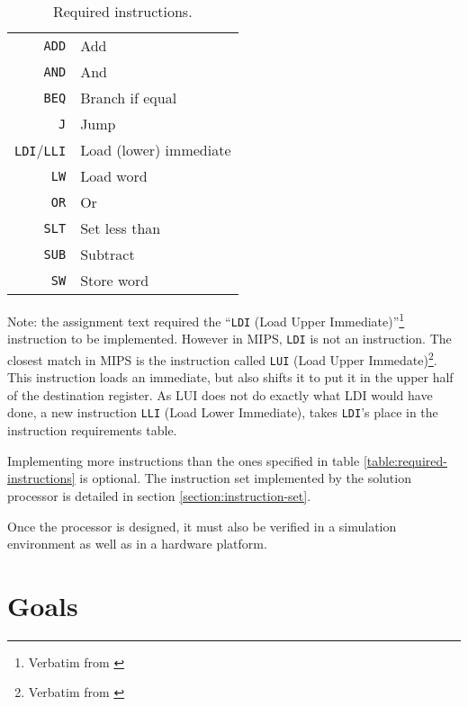 \begin{table}
    \begin{center}
        \begin{tabular}{r|l}
            \texttt{ADD} & Add \\
            \texttt{AND} & And \\
            \texttt{BEQ} & Branch if equal \\
            \texttt{J} & Jump \\
            \texttt{LDI}/\texttt{LLI} & Load (lower) immediate \\
            \texttt{LW} & Load word \\
            \texttt{OR} & Or \\
            \texttt{SLT} & Set less than \\
            \texttt{SUB} & Subtract \\
            \texttt{SW} & Store word \\
            \hline
        \end{tabular}
        \smallskip
        \smallskip
        \caption{Required instructions.}
        \label{table:required-instructions}
    \end{center}
\end{table}

Note: the assignment text required the ``\texttt{LDI} (Load Upper Immediate)''\footnote{Verbatim from \cite[p.114]{compendium}} instruction to be implemented.
However in MIPS, \texttt{LDI} is not an instruction.
The closest match in MIPS is the instruction called \texttt{LUI} (Load Upper Immedate)\footnote{Verbatim from \cite[p.114]{mips-instruction-set}}.
This instruction loads an immediate, but also shifts it to put it in the upper half of the destination register.
As LUI does not do exactly what LDI would have done, a new instruction \texttt{LLI} (Load Lower Immediate), takes \texttt{LDI}'s place in the instruction requirements table.

Implementing more instructions than the ones specified in table \vref{table:required-instructions} is optional.
The instruction set implemented by the solution processor is detailed in section \vref{section:instruction-set}.

Once the processor is designed, it must also be verified in a simulation environment as well as in a hardware platform.

\section{Goals}

